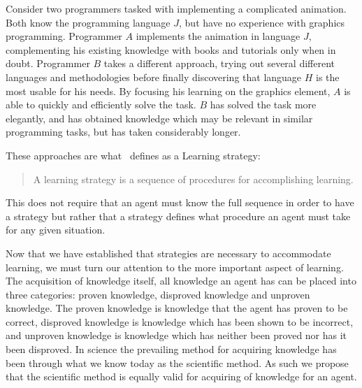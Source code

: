 \documentclass[\master/Master.tex]{subfiles}
\begin{document}
\begin{example}
    Consider two programmers tasked with implementing a complicated animation. Both know the programming language $J$, but have no experience with graphics programming. Programmer $A$ implements the animation in language $J$, complementing his existing knowledge with books and tutorials only when in doubt. Programmer $B$ takes a different approach, trying out several different languages and methodologies before finally discovering that language $H$ is the most usable for his needs. By focusing his learning on the graphics element, $A$ is able to quickly and efficiently solve the task. $B$ has solved the task more elegantly, and has obtained knowledge which may be relevant in similar programming tasks, but has taken considerably longer.
\end{example}

	These approaches are what~\cite{tobias1990a} defines as a Learning strategy:
	
\begin{quote}
	A learning strategy is a sequence of procedures for accomplishing learning.
\end{quote}
	
	This does not require that an agent must know the full sequence in order to have a strategy but rather that a strategy defines what procedure an agent must take for any given situation.

	Now that we have established that strategies are necessary to accommodate learning, we must turn our attention to the more important aspect of learning. 
	The acquisition of knowledge itself, all knowledge an agent has can be placed into three categories: proven knowledge, disproved knowledge and unproven knowledge. 
	The proven knowledge is knowledge that the agent has proven to be correct, disproved knowledge is knowledge which has been shown to be incorrect, and unproven knowledge is knowledge which has neither been proved nor has it been disproved.
	In science the prevailing method for acquiring knowledge has been through what we know today as the scientific method. 
	As such we propose that the scientific method is equally valid for acquiring of knowledge for an agent.
\end{document}
